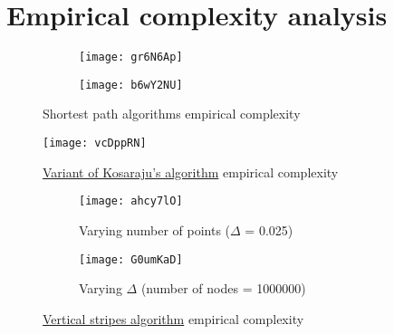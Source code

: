 \chapter{Empirical complexity analysis} \label{empirical}


\begin{figure}[H]
    \centering
    \begin{subfigure}{0.49\textwidth}
        \centering
        \texttt{[image: gr6N6Ap]}
    \end{subfigure}
    \begin{subfigure}{0.49\textwidth}
        \centering
        \texttt{[image: b6wY2NU]}
    \end{subfigure}
    \caption{Shortest path algorithms empirical complexity}
\end{figure}

\begin{figure}[H]
    \centering
    \texttt{[image: vcDppRN]}
    \caption{\hyperref[algorithm-scc-kosaraju-v]{Variant of Kosaraju's algorithm} empirical complexity}
\end{figure}

\begin{figure}[H]
    \centering
    \begin{subfigure}{0.49\textwidth}
        \centering
        \texttt{[image: ahcy7lO]}
        \caption{Varying number of points ($\Delta$ = 0.025)}
    \end{subfigure}
    \begin{subfigure}{0.49\textwidth}
        \centering
        \texttt{[image: G0umKaD]}
        \caption{Varying $\Delta$ (number of nodes = 1000000)}
    \end{subfigure}
    \caption{\hyperref[algorithm-vstripes]{Vertical stripes algorithm} empirical complexity}
\end{figure}

